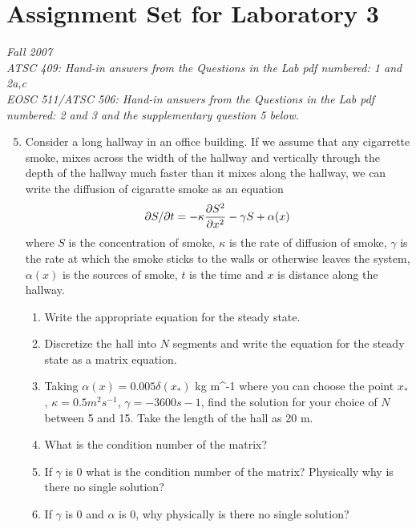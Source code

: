 \documentclass[12pt]{article}
\begin{document}
\section*{Assignment Set for Laboratory 3}
{\it Fall 2007\\
ATSC 409: Hand-in answers from the Questions in the Lab pdf numbered: 1 and 2a,c\\
EOSC 511/ATSC 506: Hand-in answers from the Questions in the Lab pdf numbered: 2 and 3 and the supplementary question 5 below.}


\begin{enumerate}
\setcounter{enumi}{4}
\item Consider a long hallway in an office building.  If we assume that any cigarrette smoke, mixes across the width of the hallway and vertically through the depth of the hallway much faster than it mixes along the hallway, we can write the diffusion of cigaratte smoke as an equation
\[
\partial S/\partial t = - \kappa \frac {\partial S^2}{\partial x^2} - \gamma S + \alpha(x)
\]
where $S$ is the concentration of smoke, $\kappa$ is the rate of diffusion of smoke, $\gamma$ is the rate at which the smoke sticks to the walls or otherwise leaves the system, $\alpha(x)$ is the sources of smoke, $t$ is the time and $x$ is distance along the hallway.
\begin{enumerate}
\item Write the appropriate equation for the steady state.
\item Discretize the hall into $N$ segments and write the equation for the steady state as a matrix equation.
\item Taking $\alpha(x) = 0.005 \delta(x_*)$ kg m^{-1} where you can choose the point $x_*$, $\kappa = 0.5 m^2 s^{-1}$, $\gamma = -3600 s-1$, find the solution for your choice of $N$ between 5 and 15.  Take the length of the hall as 20 m.
\item What is the condition number of the matrix?
\item If $\gamma$ is 0 what is the condition number of the matrix?  Physically why is there no single solution?
\item If $\gamma$ is 0 and $\alpha$ is 0, why physically is there no single solution?
\end{enumerate}
\end{enumerate}
\end{document}
